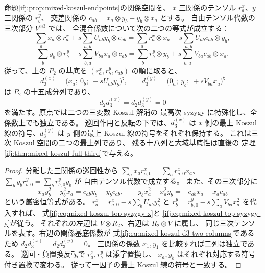 \begin{corollary}
\label{ifj:cor:mixed-koszul-two-top-syzygies}
命題\ref{ifj:prop:mixed-koszul-endpoints}の関係空間を、
$x$ 三関係のテンソル $r^x_a$、$y$ 三関係の $r^y_b$、
交差関係の $c_{ab}=x_a\otimes y_b-y_b\otimes x_a$ とする。
自由テンソル代数の三次部分 $V^{\otimes3}$ では、
全混合係数について次の二つの等式が成立する：
\begin{equation}\label{ifj:eq:mixed-koszul-top-syzygy-x}
 \sum_a x_a\otimes r^x_a+s\sum_{a,b}U_{ab}y_b\otimes c_{ab}
 =\sum_a r^x_a\otimes x_a-s\sum_{a,b}U_{ab}c_{ab}\otimes y_b,
\end{equation}
\begin{equation}\label{ifj:eq:mixed-koszul-top-syzygy-y}
 \sum_b y_b\otimes r^y_b-s\sum_{b,a}V_{ba}x_a\otimes c_{ab}
 =\sum_b r^y_b\otimes y_b+s\sum_{b,a}V_{ba}c_{ab}\otimes x_a.
\end{equation}
従って、上の $P_2$ の基底を $(r^x_a,r^y_b,c_{ab})$ の順に取ると、
\begin{equation}\label{ifj:eq:mixed-koszul-d3-two-columns}
 d_3^{(x)}=\bigl(x_a;\ 0_b;\ -sU_{ab}y_b\bigr)^{\mathsf t},\qquad
 d_3^{(y)}=\bigl(0_a;\ y_b;\ +sV_{ba}x_a\bigr)^{\mathsf t}
\end{equation}
は $P_2$ の十五成分列であり、
\[
 d_2d_3^{(x)}=d_2d_3^{(y)}=0
\]
を満たす。原点では二つの三変数 Koszul 解消の
最高次 syzygy に特殊化し、全係数上でも独立である。
巡回作用と反転の下では、$d_3^{(x)}$ は
$x$ 側の最上 Koszul 線の符号、$d_3^{(y)}$ は
$y$ 側の最上 Koszul 線の符号をそれぞれ保持する。
これは三次 Koszul 空間の二つの最上列であり、
残る十八列と大域基底性は直後の
定理\ref{ifj:thm:mixed-koszul-full-third}で与える。
\end{corollary}

\begin{proof}
分離した三関係の巡回性から
$\sum_a x_ar^x_{a,0}=\sum_a r^x_{a,0}x_a$、
$\sum_b y_br^y_{b,0}=\sum_b r^y_{b,0}y_b$ が
自由テンソル代数で成立する。
また、その三次部分に
\[
 x_ay_b^2-y_b^2x_a=c_{ab}y_b+y_bc_{ab},\qquad
 y_bx_a^2-x_a^2y_b=-c_{ab}x_a-x_ac_{ab}
\]
という厳密恒等式がある。
$r^x_a=r^x_{a,0}-s\sum_bU_{ab}y_b^2$ と
$r^y_b=r^y_{b,0}-s\sum_aV_{ba}x_a^2$ を代入すれば、
式\eqref{ifj:eq:mixed-koszul-top-syzygy-x}と
\eqref{ifj:eq:mixed-koszul-top-syzygy-y}が従う。
それぞれの左辺は $V\otimes R_2$、右辺は $R_2\otimes V$ に属し、
同じ三次テンソルを表す。右辺の関係基底係数が
式\eqref{ifj:eq:mixed-koszul-d3-two-columns}であるため
$d_2d_3^{(x)}=d_2d_3^{(y)}=0$。
三関係の係数 $x_1,y_1$ を比較すれば二列は独立である。
巡回・負置換反転で $r^x_a,r^y_b$ は添字置換し、
$x_a,y_b$ はそれぞれ対応する符号付き置換で変わる。
従って一因子の最上 Koszul 線の符号と一致する。
\end{proof}

